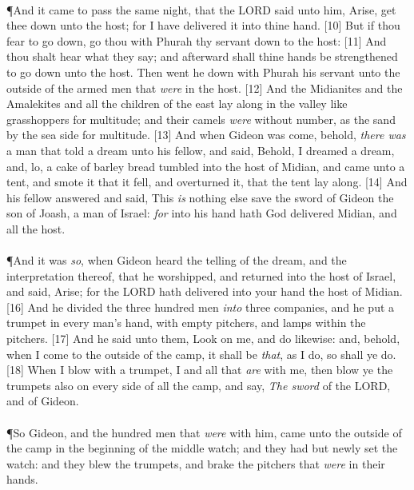 \\
\P \textcolor[rgb]{0.00,0.00,1.00}{And it came to pass the same night, that the LORD said unto him, Arise, get thee down unto the host; for I have delivered it into thine hand.}
[10] \textcolor[rgb]{0.00,0.00,1.00}{But if thou fear to go down, go thou with Phurah thy servant down to the host:}
[11] \textcolor[rgb]{0.00,0.00,1.00}{And thou shalt hear what they say; and afterward shall thine hands be strengthened to go down unto the host. Then went he down with Phurah his servant unto the outside of the armed men that \emph{were} in the host.}
[12] \textcolor[rgb]{0.00,0.00,1.00}{And the Midianites and the Amalekites and all the children of the east lay along in the valley like grasshoppers for multitude; and their camels \emph{were} without number, as the sand by the sea side for multitude.}
[13] \textcolor[rgb]{0.00,0.00,1.00}{And when Gideon was come, behold, \emph{there was} a man that told a dream unto his fellow, and said, Behold, I dreamed a dream, and, lo, a cake of barley bread tumbled into the host of Midian, and came unto a tent, and smote it that it fell, and overturned it, that the tent lay along.}
[14] \textcolor[rgb]{0.00,0.00,1.00}{And his fellow answered and said, This \emph{is} nothing else save the sword of Gideon the son of Joash, a man of Israel: \emph{for} into his hand hath God delivered Midian, and all the host.}\\
\\
\P \textcolor[rgb]{0.00,0.00,1.00}{And it was \emph{so}, when Gideon heard the telling of the dream, and the interpretation thereof, that he worshipped, and returned into the host of Israel, and said, Arise; for the LORD hath delivered into your hand the host of Midian.}
[16] \textcolor[rgb]{0.00,0.00,1.00}{And he divided the three hundred men \emph{into} three companies, and he put a trumpet in every man's hand, with empty pitchers, and lamps within the pitchers.}
[17] \textcolor[rgb]{0.00,0.00,1.00}{And he said unto them, Look on me, and do likewise: and, behold, when I come to the outside of the camp, it shall be \emph{that}, as I do, so shall ye do.}
[18] \textcolor[rgb]{0.00,0.00,1.00}{When I blow with a trumpet, I and all that \emph{are} with me, then blow ye the trumpets also on every side of all the camp, and say, \emph{The sword} of the LORD, and of Gideon.}\\
\\
\P \textcolor[rgb]{0.00,0.00,1.00}{So Gideon, and the hundred men that \emph{were} with him, came unto the outside of the camp in the beginning of the middle watch; and they had but newly set the watch: and they blew the trumpets, and brake the pitchers that \emph{were} in their hands.}
